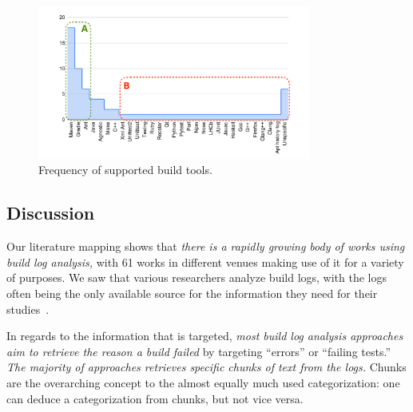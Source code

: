 \begin{figure}[tbp]
		\centering
		\includegraphics[width=0.8\textwidth, trim={1.5cm 0.4cm
		1.5cm 0.5cm},
		clip]{img/lit-sur/log_producer_annotated.pdf}
		\caption{Frequency of supported build tools.}
		\label{fig:litsur:log_producer}
\end{figure}

\subsection{Discussion}
\label{sec:lit-sur:discussion}

Our literature mapping shows that \emph{there is a rapidly growing body
of works using build log analysis,}
with 61 works in different venues making use of it for a variety of
purposes.
We saw that various researchers analyze build logs, with the
logs often being the only available source for the
information they need for their studies~\citep{ren2018automated,
seo2014programmers,beller2017oops,zampetti2017open,rausch2017empirical}.

In regards to the information that is targeted, \emph{most build log
analysis approaches aim to retrieve the reason a build failed} by
targeting ``errors'' or ``failing tests.''
\emph{The majority of approaches retrieves specific chunks of
text from the logs.} Chunks are the overarching concept to
the almost equally much used categorization: one can deduce a
categorization from chunks, but not vice versa.

